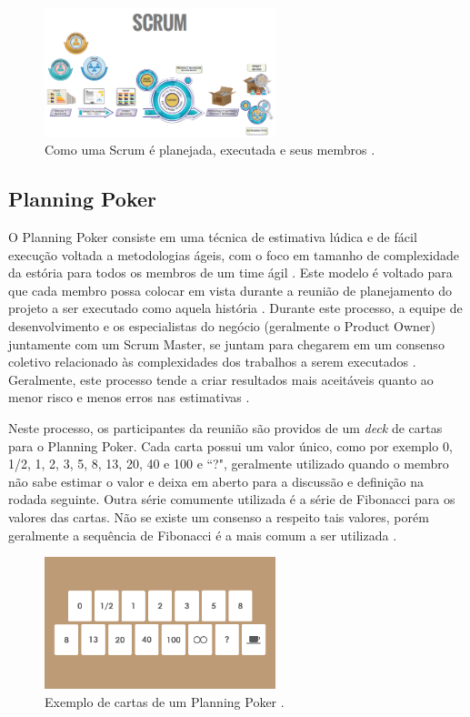 \begin{figure}[h!]
    \centering
    \includegraphics[width=0.6\textwidth]{img/Imagem Scrum Primer.png}
    \caption{Como uma Scrum é planejada, executada e seus membros \cite{primer}.}
    \label{fig:scrum}
\end{figure}

\subsection{Planning Poker}

O Planning Poker consiste em uma técnica de estimativa lúdica e de fácil execução voltada a metodologias ágeis, com o foco em tamanho de complexidade da estória para todos os membros de um time ágil \cite{planningpoker,usingfunctionpoints,storyestimation}. Este modelo é voltado para que cada membro possa colocar em vista durante a reunião de planejamento do projeto a ser executado como aquela história \cite{Scrum}. Durante este processo, a equipe de desenvolvimento e os especialistas do negócio (geralmente o Product Owner) juntamente com um Scrum Master, se juntam para chegarem em um consenso coletivo relacionado às complexidades dos trabalhos a serem executados \cite{techplanningpoker}. Geralmente, este processo tende a criar resultados mais aceitáveis quanto ao menor risco e menos erros nas estimativas \cite{usingplanningpoker2}.

Neste processo, os participantes da reunião são providos de um \textit{deck} de cartas para o Planning Poker. Cada carta possui um valor único, como por exemplo 0, 1/2, 1, 2, 3, 5, 8, 13, 20, 40 e 100 e ``?", geralmente utilizado quando o membro não sabe estimar o valor e deixa em aberto para a discussão e definição na rodada seguinte. Outra série comumente utilizada é a série de Fibonacci para os valores das cartas. Não se existe um consenso a respeito tais valores, porém geralmente a sequência de Fibonacci é a mais comum a ser utilizada \cite{evaluatingplanningpoker}.

\begin{figure}[h!]
    \centering
    \includegraphics[width=0.6\textwidth]{img/planningpoker.png}
    \caption{Exemplo de cartas de um Planning Poker \cite{visual}.}
    \label{fig:planningpoker}
\end{figure}



